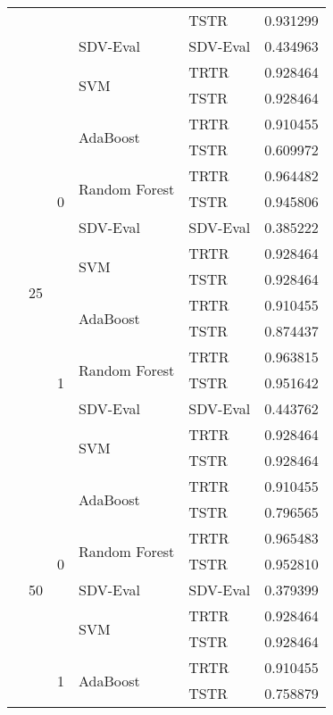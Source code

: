 \begin{longtable}{lllllr}
 &  &  &  & TSTR & 0.931299 \\
\cline{4-6}
 &  &  & SDV-Eval & SDV-Eval & 0.434963 \\
\cline{4-6}
 &  &  & \multirow[t]{2}{*}{SVM} & TRTR & 0.928464 \\
 &  &  &  & TSTR & 0.928464 \\
\cline{2-6} \cline{3-6} \cline{4-6}
 & \multirow[t]{14}{*}{25} & \multirow[t]{7}{*}{0} & \multirow[t]{2}{*}{AdaBoost} & TRTR & 0.910455 \\
 &  &  &  & TSTR & 0.609972 \\
\cline{4-6}
 &  &  & \multirow[t]{2}{*}{Random Forest} & TRTR & 0.964482 \\
 &  &  &  & TSTR & 0.945806 \\
\cline{4-6}
 &  &  & SDV-Eval & SDV-Eval & 0.385222 \\
\cline{4-6}
 &  &  & \multirow[t]{2}{*}{SVM} & TRTR & 0.928464 \\
 &  &  &  & TSTR & 0.928464 \\
\cline{3-6} \cline{4-6}
 &  & \multirow[t]{7}{*}{1} & \multirow[t]{2}{*}{AdaBoost} & TRTR & 0.910455 \\
 &  &  &  & TSTR & 0.874437 \\
\cline{4-6}
 &  &  & \multirow[t]{2}{*}{Random Forest} & TRTR & 0.963815 \\
 &  &  &  & TSTR & 0.951642 \\
\cline{4-6}
 &  &  & SDV-Eval & SDV-Eval & 0.443762 \\
\cline{4-6}
 &  &  & \multirow[t]{2}{*}{SVM} & TRTR & 0.928464 \\
 &  &  &  & TSTR & 0.928464 \\
\cline{2-6} \cline{3-6} \cline{4-6}
 & \multirow[t]{14}{*}{50} & \multirow[t]{7}{*}{0} & \multirow[t]{2}{*}{AdaBoost} & TRTR & 0.910455 \\
 &  &  &  & TSTR & 0.796565 \\
\cline{4-6}
 &  &  & \multirow[t]{2}{*}{Random Forest} & TRTR & 0.965483 \\
 &  &  &  & TSTR & 0.952810 \\
\cline{4-6}
 &  &  & SDV-Eval & SDV-Eval & 0.379399 \\
\cline{4-6}
 &  &  & \multirow[t]{2}{*}{SVM} & TRTR & 0.928464 \\
 &  &  &  & TSTR & 0.928464 \\
\cline{3-6} \cline{4-6}
 &  & \multirow[t]{7}{*}{1} & \multirow[t]{2}{*}{AdaBoost} & TRTR & 0.910455 \\
 &  &  &  & TSTR & 0.758879 \\

\end{longtable}
